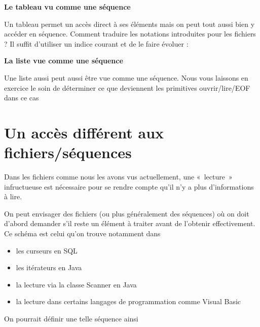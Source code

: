 {\sffamily\bfseries\upshape
Le tableau vu comme une séquence}

Un tableau permet un accès direct à ses éléments mais on peut tout aussi
bien y accéder en séquence. Comment traduire les notations introduites
pour les fichiers ? Il suffit d'utiliser un indice
courant et de le faire évoluer :


{\sffamily\bfseries\upshape
La liste vue comme une séquence}

Une liste aussi peut aussi être vue comme une séquence. Nous vous
laissons en exercice le soin de déterminer ce que deviennent les
primitives ouvrir/lire/\textsf{EOF} dans ce cas

\section{Un accès différent aux fichiers/séquences}

Dans les fichiers comme nous les avons vus actuellement, une «~lecture~»
infructueuse est nécessaire pour se rendre compte
qu'il n'y a plus
d'informations à lire. 

On peut envisager des fichiers (ou plus généralement des séquences) où
on doit d'abord demander s'il reste
un élément à traiter avant de l'obtenir effectivement.
Ce schéma est celui qu'on trouve notamment dans 

\liststyleListv
\begin{itemize}
	\item 
		les curseurs en SQL
	\item 
		les itérateurs en Java
	\item 
		la lecture via la classe Scanner en Java
	\item 
		la lecture dans certains langages de programmation comme Visual Basic
\end{itemize}

On pourrait définir une telle séquence ainsi

